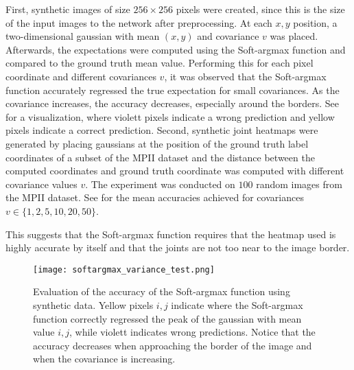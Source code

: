 First, synthetic images of size $256 \times 256$ pixels were created, since this is the size of the input images to the network after preprocessing.
At each $x,y$ position, a two-dimensional gaussian with mean $(x,y)$ and covariance $v$ was placed.
Afterwards, the expectations were computed using the Soft-argmax function and compared to the ground truth mean value.
Performing this for each pixel coordinate and different covariances $v$, it was observed that the Soft-argmax function accurately regressed the true expectation for small covariances.
As the covariance increases, the accuracy decreases, especially around the borders.
See  for a visualization, where violett pixels indicate a wrong prediction and yellow pixels indicate a correct prediction.
Second, synthetic joint heatmaps were generated by placing gaussians at the position of the ground truth label coordinates of a subset of the MPII dataset and the distance between the computed coordinates and ground truth coordinate was computed with different covariance values $v$.
The experiment was conducted on $100$ random images from the MPII dataset.
See  for the mean accuracies achieved for covariances $v \in \{1, 2, 5, 10, 20, 50 \}$.

\begin{table}[]
    \centering
    \caption{Mean average accuracy of Soft-argmax when detecting ground truth coordinates from synthetic joint heatmaps.} %
    \label{tab:softargmax_numeric_eval}
\end{table}

This suggests that the Soft-argmax function requires that the heatmap used is highly accurate by itself and that the joints are not too near to the image border.

\begin{figure}[htb!]
    \centering
    \texttt{[image: softargmax\_variance\_test.png]}
    \caption{Evaluation of the accuracy of the Soft-argmax function using synthetic data. Yellow pixels $i,j$ indicate where the Soft-argmax function correctly regressed the peak of the gaussian with mean value $i,j$, while violett indicates wrong predictions. Notice that the accuracy decreases when approaching the border of the image and when the covariance is increasing. }
    \label{fig:softargmax_variance_test}
\end{figure}

